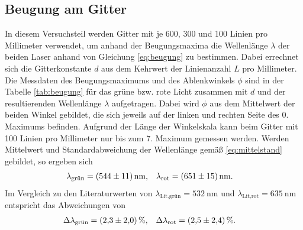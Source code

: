 \subsection{Beugung am Gitter}
\label{sec:ausw_beugung}

In diesem Versuchsteil werden Gitter mit je 600, 300 und 100 Linien pro Millimeter verwendet, um anhand der Beugungsmaxima die Wellenlänge 
$\lambda$ der beiden Laser anhand von Gleichung \eqref{eq:beugung} zu bestimmen.
Dabei errechnet sich die Gitterkonstante $d$ aus dem Kehrwert der Linienanzahl $L$ pro Millimeter.
Die Messdaten des Beugungsmaximums und des Ablenkwinkels $\phi$ sind in der Tabelle \ref{tab:beugung} für das grüne bzw. rote Licht
zusammen mit $d$ und der resultierenden Wellenlänge $\lambda$ aufgetragen.
Dabei wird $\phi$ aus dem Mittelwert der beiden Winkel gebildet, die sich jeweils auf der linken und rechten Seite des 0. Maximums befinden.
Aufgrund der Länge der Winkelskala kann beim Gitter mit 100 Linien pro Millimeter nur bis zum 7. Maximum gemessen werden.
Werden Mittelwert und Standardabweichung der Wellenlänge gemäß \eqref{eq:mittelstand} gebildet, so ergeben sich
\begin{align}
    \lambda_\text{grün} & = (\num[]{544 +- 11}) \, \unit[]{\nano\meter}, & \lambda_\text{rot} & = (\num[]{651 +- 15}) \, \unit[]{\nano\meter}.
\end{align}
Im Vergleich zu den Literaturwerten \cite[]{man:v400} von $\lambda_\text{Lit,grün} = \qty[]{532}{\nano\meter}$ und 
$\lambda_\text{Lit,rot} = \qty[]{635}{\nano\meter}$ entspricht das Abweichungen von 
\begin{align}
    \Delta \lambda_\text{grün} &= (\num[]{2.3 +- 2.0}) \, \%, & \Delta \lambda_\text{rot} &= (\num[]{2.5 +- 2.4}) \, \%.
\end{align}



